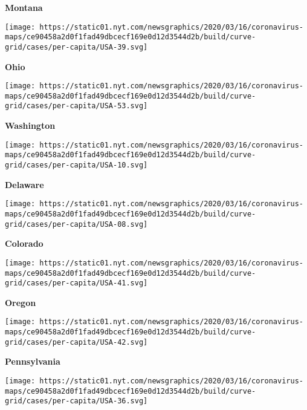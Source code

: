 \textbf{Montana}

\href{https://www.nytimes.com/interactive/2020/us/ohio-coronavirus-cases.html}{}

\texttt{[image: https://static01.nyt.com/newsgraphics/2020/03/16/coronavirus-maps/ce90458a2d0f1fad49dbcecf169e0d12d3544d2b/build/curve-grid/cases/per-capita/USA-39.svg]}

\textbf{Ohio}

\href{https://www.nytimes.com/interactive/2020/us/washington-coronavirus-cases.html}{}

\texttt{[image: https://static01.nyt.com/newsgraphics/2020/03/16/coronavirus-maps/ce90458a2d0f1fad49dbcecf169e0d12d3544d2b/build/curve-grid/cases/per-capita/USA-53.svg]}

\textbf{Washington}

\href{https://www.nytimes.com/interactive/2020/us/delaware-coronavirus-cases.html}{}

\texttt{[image: https://static01.nyt.com/newsgraphics/2020/03/16/coronavirus-maps/ce90458a2d0f1fad49dbcecf169e0d12d3544d2b/build/curve-grid/cases/per-capita/USA-10.svg]}

\textbf{Delaware}

\href{https://www.nytimes.com/interactive/2020/us/colorado-coronavirus-cases.html}{}

\texttt{[image: https://static01.nyt.com/newsgraphics/2020/03/16/coronavirus-maps/ce90458a2d0f1fad49dbcecf169e0d12d3544d2b/build/curve-grid/cases/per-capita/USA-08.svg]}

\textbf{Colorado}

\href{https://www.nytimes.com/interactive/2020/us/oregon-coronavirus-cases.html}{}

\texttt{[image: https://static01.nyt.com/newsgraphics/2020/03/16/coronavirus-maps/ce90458a2d0f1fad49dbcecf169e0d12d3544d2b/build/curve-grid/cases/per-capita/USA-41.svg]}

\textbf{Oregon}

\href{https://www.nytimes.com/interactive/2020/us/pennsylvania-coronavirus-cases.html}{}

\texttt{[image: https://static01.nyt.com/newsgraphics/2020/03/16/coronavirus-maps/ce90458a2d0f1fad49dbcecf169e0d12d3544d2b/build/curve-grid/cases/per-capita/USA-42.svg]}

\textbf{Pennsylvania}

\href{https://www.nytimes.com/interactive/2020/us/new-york-coronavirus-cases.html}{}

\texttt{[image: https://static01.nyt.com/newsgraphics/2020/03/16/coronavirus-maps/ce90458a2d0f1fad49dbcecf169e0d12d3544d2b/build/curve-grid/cases/per-capita/USA-36.svg]}

